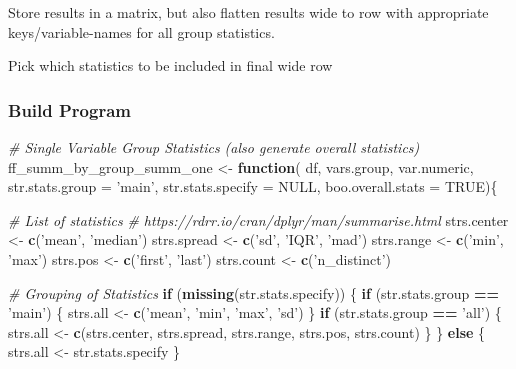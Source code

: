 \documentclass[
]{book}
\newenvironment{Shaded}{\begin{snugshade}}{\end{snugshade}}
\newcommand{\CommentTok}[1]{\textcolor[rgb]{0.56,0.35,0.01}{\textit{#1}}}
\newcommand{\ControlFlowTok}[1]{\textcolor[rgb]{0.13,0.29,0.53}{\textbf{#1}}}
\newcommand{\DataTypeTok}[1]{\textcolor[rgb]{0.13,0.29,0.53}{#1}}
\newcommand{\KeywordTok}[1]{\textcolor[rgb]{0.13,0.29,0.53}{\textbf{#1}}}
\newcommand{\NormalTok}[1]{#1}
\newcommand{\OperatorTok}[1]{\textcolor[rgb]{0.81,0.36,0.00}{\textbf{#1}}}
\newcommand{\OtherTok}[1]{\textcolor[rgb]{0.56,0.35,0.01}{#1}}
\newcommand{\StringTok}[1]{\textcolor[rgb]{0.31,0.60,0.02}{#1}}
\begin{document}
Store results in a matrix, but also flatten results wide to row with appropriate keys/variable-names for all group statistics.

Pick which statistics to be included in final wide row

\hypertarget{build-program}{%
\subsubsection{Build Program}\label{build-program}}

\begin{Shaded}
\begin{Highlighting}[]
\CommentTok{# Single Variable Group Statistics (also generate overall statistics)}
\NormalTok{ff_summ_by_group_summ_one <-}\StringTok{ }\ControlFlowTok{function}\NormalTok{(}
\NormalTok{  df, vars.group, var.numeric, }\DataTypeTok{str.stats.group =} \StringTok{'main'}\NormalTok{,}
  \DataTypeTok{str.stats.specify =} \OtherTok{NULL}\NormalTok{, }\DataTypeTok{boo.overall.stats =} \OtherTok{TRUE}\NormalTok{)\{}
  
  \CommentTok{# List of statistics}
  \CommentTok{# https://rdrr.io/cran/dplyr/man/summarise.html}
\NormalTok{  strs.center <-}\StringTok{ }\KeywordTok{c}\NormalTok{(}\StringTok{'mean'}\NormalTok{, }\StringTok{'median'}\NormalTok{)}
\NormalTok{  strs.spread <-}\StringTok{ }\KeywordTok{c}\NormalTok{(}\StringTok{'sd'}\NormalTok{, }\StringTok{'IQR'}\NormalTok{, }\StringTok{'mad'}\NormalTok{)}
\NormalTok{  strs.range <-}\StringTok{ }\KeywordTok{c}\NormalTok{(}\StringTok{'min'}\NormalTok{, }\StringTok{'max'}\NormalTok{)}
\NormalTok{  strs.pos <-}\StringTok{ }\KeywordTok{c}\NormalTok{(}\StringTok{'first'}\NormalTok{, }\StringTok{'last'}\NormalTok{)}
\NormalTok{  strs.count <-}\StringTok{ }\KeywordTok{c}\NormalTok{(}\StringTok{'n_distinct'}\NormalTok{)}
  
  \CommentTok{# Grouping of Statistics}
  \ControlFlowTok{if}\NormalTok{ (}\KeywordTok{missing}\NormalTok{(str.stats.specify)) \{}
    \ControlFlowTok{if}\NormalTok{ (str.stats.group }\OperatorTok{==}\StringTok{ 'main'}\NormalTok{) \{}
\NormalTok{      strs.all <-}\StringTok{ }\KeywordTok{c}\NormalTok{(}\StringTok{'mean'}\NormalTok{, }\StringTok{'min'}\NormalTok{, }\StringTok{'max'}\NormalTok{, }\StringTok{'sd'}\NormalTok{)}
\NormalTok{    \}}
    \ControlFlowTok{if}\NormalTok{ (str.stats.group }\OperatorTok{==}\StringTok{ 'all'}\NormalTok{) \{}
\NormalTok{      strs.all <-}\StringTok{ }\KeywordTok{c}\NormalTok{(strs.center, strs.spread, strs.range, strs.pos, strs.count)}
\NormalTok{    \}}
\NormalTok{  \} }\ControlFlowTok{else}\NormalTok{ \{}
\NormalTok{    strs.all <-}\StringTok{ }\NormalTok{str.stats.specify}
\NormalTok{  \}}
  

\end{Highlighting}
\end{Shaded}
\end{document}
